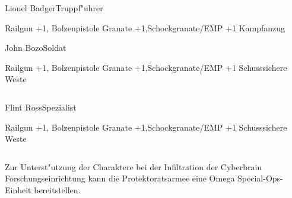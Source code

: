 \begin{column}[l]{0.45}
    \begin{nscsheet}[h]{Lionel Badger\newline{}Truppf"uhrer}
        \nscstats[ATT=2,AGG=2]
        \nscruler
        \begin{nscinventory}
            \nscitem[Waffen] Railgun +1, Bolzenpistole
            \nscitem[Granaten] Granate +1,\newline{}Schockgranate/EMP +1
            \nscitem[R"ustung] Kampfanzug
        \end{nscinventory}
    \end{nscsheet}

    \begin{nscsheet}[h]{John Bozo\newline{}Soldat}
        \nscstats[ATT=2,AGG=2]
        \nscruler
        \begin{nscinventory}
            \nscitem[Waffen] Railgun +1, Bolzenpistole
            \nscitem[Granaten] Granate +1,\newline{}Schockgranate/EMP +1
            \nscitem[R"ustung] Schusssichere Weste
        \end{nscinventory}
    \end{nscsheet}
\end{column}
\begin{column}[r]{0.45}
    \begin{nscsheet}[h]{Flint Ross\newline{}Spezialist}
        \nscstats[ATT=2,AGG=1,DEX=3]
        \nscruler
        \begin{nscinventory}
            \nscitem[Waffen] Railgun +1, Bolzenpistole
            \nscitem[Granaten] Granate +1,\newline{}Schockgranate/EMP +1
            \nscitem[R"ustung] Schusssichere Weste
        \end{nscinventory}
    \end{nscsheet}
\end{column}
\vfill

\pagebreak
{}

Zur Unterst"utzung der Charaktere bei der Infiltration der Cyberbrain Forschungseinrichtung kann die Protektoratsarmee eine 
Omega Special-Ops-Einheit bereitstellen.

